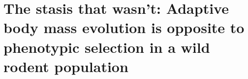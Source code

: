 \chapter[The stasis that wasn't]{The stasis that wasn't: Adaptive body mass evolution is opposite to phenotypic selection in a wild rodent population}